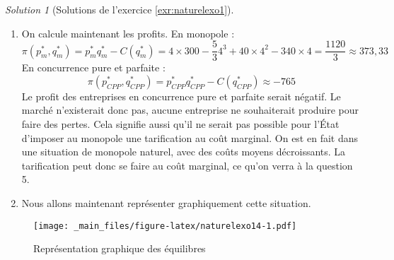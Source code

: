 \documentclass[
]{book}
\theoremstyle{definition}
\theoremstyle{definition}
\theoremstyle{definition}
\theoremstyle{definition}
\theoremstyle{remark}
\newtheorem*{solution}{Solution}
\begin{document}
\begin{solution}[Solutions de l'exercice \ref{exr:naturelexo1}]
\begin{enumerate}
  On doit donc résoudre une équation du second degré pour obtenir le résultat.
  On commence par calculer le discriminant :
  \[\Delta=(-6)^2+4\times32=36+128=164=4\times41\]
  On en déduit que :
  \[q^*=\frac{6\pm\sqrt{41}}{2}=3+\sqrt{41}\text{ ou } 3-\sqrt{41}\]
  La solution \(q^*=3-\sqrt{41}<0\) est impossible, car les quantités sont forcément positives.
  La seule solution est donc \(q^*_{CPP}=3+\sqrt{41}\approx\) 9.4.
  On peut en déduire \(p^*_{CPP}=50(7-\sqrt{41})\approx\) 29.84.
\item
  On calcule maintenant les profits.
  En monopole :
  \[\pi(p^*_m, q^*_m)=p^*_mq^*_m-C(q^*_m)=4\times300-\frac{5}{3}4^3+40\times4^2-340\times4=\frac{1120}{3}\approx 373,33\]
  En concurrence pure et parfaite :
  \[\pi(p^*_{CPP}, q^*_{CPP})=p^*_{CPP}q^*_{CPP}-C(q^*_{CPP})\approx-765\]
  Le profit des entreprises en concurrence pure et parfaite serait négatif.
  Le marché n'existerait donc pas, aucune entreprise ne souhaiterait produire pour faire des pertes.
  Cela signifie aussi qu'il ne serait pas possible pour l'État d'imposer au monopole une tarification au coût marginal.
  On est en fait dans une situation de monopole naturel, avec des coûts moyens décroissants.
  La tarification peut donc se faire au coût marginal, ce qu'on verra à la question 5.
\item
  Nous allons maintenant représenter graphiquement cette situation.
\end{enumerate}

\begin{figure}
\centering
\texttt{[image: \_main\_files/figure-latex/naturelexo14-1.pdf]}
\caption{\label{fig:naturelexo14}Représentation graphique des équilibres}
\end{figure}


\end{solution}
\end{document}
